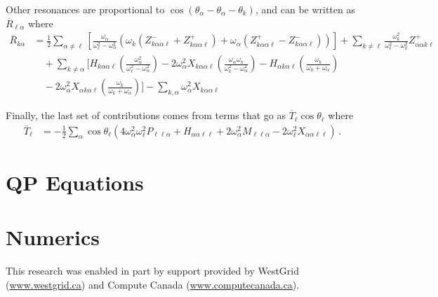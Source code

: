 \documentclass[letterpaper,11pt]{article}
\newcommand{\ok}{\omega_k}
\newcommand{\ol}{\omega_\ell}
\newcommand{\thk}{\theta_k}
\newcommand{\oal}{\omega_\alpha}
\begin{document}
Other resonances are proportional to $\cos \left( \theta_\alpha - \theta_\alpha - \thk \right)$, and can be written as $\overline{R}_{\ell \alpha}$ where
\begin{align}
\overline{R}_{k \alpha} &= \frac{1}{2} \sum_{\alpha \neq \ell} \left[ \frac{\oal}{\ol^2 - \oal^2} \left( \ok (Z^{-}_{k \alpha \alpha \ell} + Z^{+}_{k \alpha \alpha \ell} ) + \oal (Z^{+}_{k \alpha \alpha \ell} - Z^{-}_{k \alpha \alpha \ell} ) \right) \right]  + \sum_{k \neq \ell} \frac{\ok^2}{\ol^2 - \ok^2} Z^{+}_{\alpha \alpha k \ell} \nonumber \\
%
& \quad + \sum_{k \neq \alpha} \bigg[ H_{k \alpha \alpha \ell} \left( \frac{\oal^2}{\ol^2 - \oal^2} \right) - 2 \oal^2 X_{k \alpha \alpha \ell} \left( \frac{\oal \ok}{\ok^2 - \oal^2} \right) - H_{\alpha k \alpha \ell} \left( \frac{\ok}{\ok + \oal} \right) \nonumber \\
%
& \quad  - 2 \oal^2 X_{\alpha k \alpha \ell} \left( \frac{\ok}{\ok + \oal} \right) \bigg] - \sum_{k, \alpha} \oal^2 X_{k \alpha \alpha \ell}
\end{align}

Finally, the last set of contributions comes from terms that go as $\overline{T}_\ell \cos \theta_\ell$ where
\begin{align}
\overline{T}_\ell &= - \frac{1}{2} \sum_\alpha \cos \theta_\ell \left( 4 \oal^2 \ol^2 P_{\ell \ell \alpha} + H_{\alpha \alpha \ell \ell} + 2 \oal^2 M_{\ell \ell \alpha} - 2 \ol^2 X_{\alpha \alpha \ell \ell} \right) \, .
\end{align}



\section{QP Equations}


\section{Numerics}


\acknowledgments

This research was enabled in part by support provided by WestGrid (\href{www.westgrid.ca}{www.westgrid.ca}) and Compute Canada (\href{www.computecanada.ca}{www.computecanada.ca}).
\end{document}
